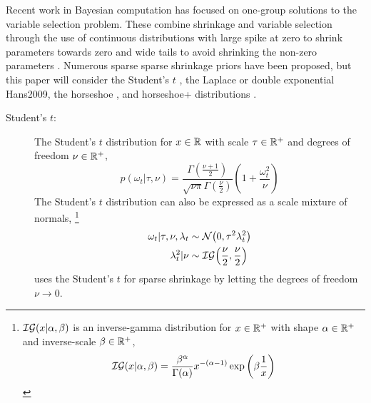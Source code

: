 Recent work in Bayesian computation has focused on one-group solutions to the variable selection problem.
These combine shrinkage and variable selection through the use of continuous distributions with large spike at zero to shrink parameters towards zero and wide tails to avoid shrinking the non-zero parameters \parencite{PolsonScott2010}.
Numerous sparse sparse shrinkage priors have been proposed, but this paper will consider the Student's $t$  \parencite{Tipping2001}, the Laplace or double exponential \parencite{ParkCasella2008}{Hans2009}, the horseshoe \parencite{CarvalhoPolsonScott2010}, and horseshoe+ distributions \parencite{BhadraDattaPolsonEtAl2015a}.

\begin{description}
\item[Student's $t$:] The Student's $t$ distribution for $x \in \mathbb{R}$  with scale $\tau \in \mathbb{R}^{+}$ and degrees of freedom $\nu \in \mathbb{R}^{+}$,
\begin{equation}
  \label{dlm:eq:6}
  p(\omega_{t} | \tau, \nu) = \frac{\Gamma\left(\frac{\nu + 1}{2}\right)}{\sqrt{\nu \pi} \Gamma\left( \frac{\nu}{2} \right)} \left( 1 + \frac{\omega_{t}^{2}}{\nu} \right)
\end{equation}
The Student's $t$ distribution can also be expressed as a scale mixture of normals,%
\footnote{
  $\mathcal{IG}\mathopen{}\left(x | \alpha, \beta\right)\mathclose{}$ is an inverse-gamma distribution for $x \in \mathbb{R}^{+}$ with shape $\alpha \in \mathbb{R}^{+}$ and inverse-scale $\beta \in \mathbb{R}^{+}$,
  \begin{equation}
    \label{dlm:eq:9}
    \mathcal{IG}\mathopen{}\left(x | \alpha, \beta\right)\mathclose{} = \frac{\beta^{\alpha}}{\Gamma(\alpha)} x^{-(\alpha - 1)} \exp 
    \left(
      \beta \frac{1}{x}
    \right)
  \end{equation}
}
\begin{equation}
  \label{dlm:eq:5}
  \begin{aligned}[t]
  \omega_{t} | \tau, \nu, \lambda_{t} &\sim \mathcal{N}\mathopen{}\left(0, \tau^{2} \lambda_{t}^{2}\right)\mathclose{} \\
  \lambda_{t}^{2} | \nu & \sim \mathcal{IG}\mathopen{}\left(\frac{\nu}{2}, \frac{\nu}{2}\right)\mathclose{}
  \end{aligned}
\end{equation}
\parencite{Tipping2001} uses the Student's $t$ for sparse shrinkage by letting the degrees of freedom $\nu \to 0$.


\end{description}
